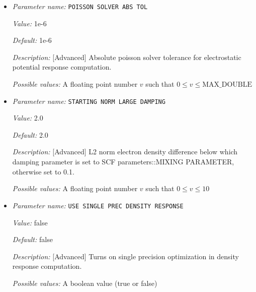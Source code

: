 \begin{itemize}
{\it Value:} ADAPTIVE


{\it Default:} ADAPTIVE


{\it Description:} [Advanced] Method subtype for LOW\_RANK\_DIELECM\_PRECOND.


{\it Possible values:} Any one of ADAPTIVE, ACCUMULATED\_ADAPTIVE
\item {\it Parameter name:} {\tt POISSON SOLVER ABS TOL}
\label{parameters:SCF parameters/LOW RANK DIELECM PRECOND/POISSON SOLVER ABS TOL}
\label{parameters:SCF_20parameters/LOW_20RANK_20DIELECM_20PRECOND/POISSON_20SOLVER_20ABS_20TOL}


{\it Value:} 1e-6


{\it Default:} 1e-6


{\it Description:} [Advanced] Absolute poisson solver tolerance for electrostatic potential response computation.


{\it Possible values:} A floating point number $v$ such that $0 \leq v \leq \text{MAX\_DOUBLE}$
\item {\it Parameter name:} {\tt STARTING NORM LARGE DAMPING}
\label{parameters:SCF parameters/LOW RANK DIELECM PRECOND/STARTING NORM LARGE DAMPING}
\label{parameters:SCF_20parameters/LOW_20RANK_20DIELECM_20PRECOND/STARTING_20NORM_20LARGE_20DAMPING}


{\it Value:} 2.0


{\it Default:} 2.0


{\it Description:} [Advanced] L2 norm electron density difference below which damping parameter is set to SCF parameters::MIXING PARAMETER, otherwise set to 0.1.


{\it Possible values:} A floating point number $v$ such that $0 \leq v \leq 10$
\item {\it Parameter name:} {\tt USE SINGLE PREC DENSITY RESPONSE}
\label{parameters:SCF parameters/LOW RANK DIELECM PRECOND/USE SINGLE PREC DENSITY RESPONSE}
\label{parameters:SCF_20parameters/LOW_20RANK_20DIELECM_20PRECOND/USE_20SINGLE_20PREC_20DENSITY_20RESPONSE}


{\it Value:} false


{\it Default:} false


{\it Description:} [Advanced] Turns on single precision optimization in density response computation.


{\it Possible values:} A boolean value (true or false)
\end{itemize}
